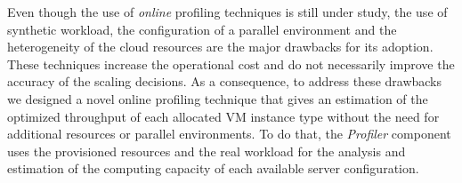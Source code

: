 
Even though the use of \emph{online} profiling techniques is still under study, the use of synthetic workload, the configuration of a parallel environment and the heterogeneity of the cloud resources are the major drawbacks for its adoption. These techniques increase the operational cost and do not necessarily improve the accuracy of the scaling decisions. As a consequence, to address these drawbacks we designed a novel online profiling technique that gives an estimation of the optimized throughput of each allocated VM instance type without the need for additional resources or parallel environments. To do that, the \emph{Profiler} component uses the provisioned resources and the real workload for the analysis and estimation of the computing capacity of each available server configuration.





